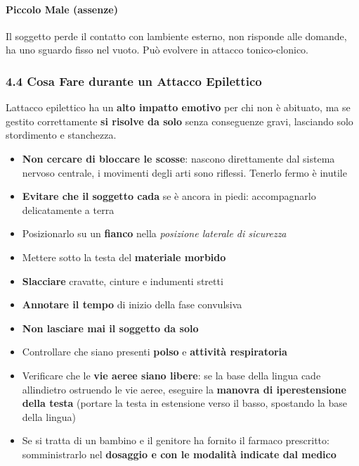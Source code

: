 \documentclass[a4paper,11pt]{article}
\providecommand{\tightlist}{%
  \setlength{\itemsep}{0pt}\setlength{\parskip}{0pt}}
\begin{document}
\paragraph{Piccolo Male (assenze)}\label{piccolo-male-assenze}

Il soggetto perde il contatto con l\textquotesingle ambiente esterno,
non risponde alle domande, ha uno sguardo fisso nel vuoto. Può evolvere
in attacco tonico-clonico.

\subsubsection{4.4 Cosa Fare durante un Attacco
      Epilettico}\label{cosa-fare-durante-un-attacco-epilettico}

L\textquotesingle attacco epilettico ha un \textbf{alto impatto emotivo}
per chi non è abituato, ma se gestito correttamente \textbf{si risolve
      da solo} senza conseguenze gravi, lasciando solo stordimento e
stanchezza.

\begin{itemize}
      \tightlist
      \item
            \textbf{Non cercare di bloccare le scosse}: nascono direttamente dal
            sistema nervoso centrale, i movimenti degli arti sono riflessi.
            Tenerlo fermo è inutile
      \item
            \textbf{Evitare che il soggetto cada} se è ancora in piedi:
            accompagnarlo delicatamente a terra
      \item
            Posizionarlo su un \textbf{fianco} nella \emph{posizione laterale di
                  sicurezza}
      \item
            Mettere sotto la testa del \textbf{materiale morbido}
      \item
            \textbf{Slacciare} cravatte, cinture e indumenti stretti
      \item
            \textbf{Annotare il tempo} di inizio della fase convulsiva
      \item
            \textbf{Non lasciare mai il soggetto da solo}
      \item
            Controllare che siano presenti \textbf{polso} e \textbf{attività
                  respiratoria}
      \item
            Verificare che le \textbf{vie aeree siano libere}: se la base della
            lingua cade all\textquotesingle indietro ostruendo le vie aeree,
            eseguire la \textbf{manovra di iperestensione della testa} (portare la
            testa in estensione verso il basso, spostando la base della lingua)
      \item
            Se si tratta di un bambino e il genitore ha fornito il farmaco
            prescritto: somministrarlo nel \textbf{dosaggio e con le modalità
                  indicate dal medico}
\end{itemize}
\end{document}
